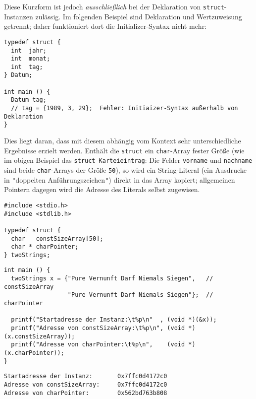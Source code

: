 Diese Kurzform ist jedoch \emph{ausschließlich} bei der Deklaration von \texttt{struct}-Instanzen zulässig. Im folgenden Beispiel sind Deklaration und Wertzuweisung getrennt; daher funktioniert dort die Initializer-Syntax nicht mehr:

\begin{codebox}
\begin{verbatim}
typedef struct {
  int  jahr;
  int  monat;
  int  tag;
} Datum;

int main () {
  Datum tag;
  // tag = {1989, 3, 29};  Fehler: Initiaizer-Syntax außerhalb von Deklaration
}
\end{verbatim}
\end{codebox}

Dies liegt daran, dass mit diesem abhängig vom Kontext sehr unterschiedliche Ergebnisse erzielt werden. Enthält die \texttt{struct} ein \texttt{char}-Array fester Größe (wie im obigen Beispiel das \texttt{struct Karteieintrag}: Die Felder \texttt{vorname} und \texttt{nachname} sind beide \texttt{char}-Arrays der Größe \texttt{50}), so wird ein String-Literal (ein Ausdrucke in \texttt{"}doppelten Anführungszeichen\texttt{"}) direkt in das Array kopiert; allgemeinen Pointern dagegen wird die Adresse des Literals selbst zugewisen.

\begin{codebox}
\begin{verbatim}
#include <stdio.h>
#include <stdlib.h>

typedef struct {
  char   constSizeArray[50];
  char * charPointer;
} twoStrings;
\end{verbatim}
\end{codebox}
%
\begin{codebox}[]
\begin{verbatim}
int main () {
  twoStrings x = {"Pure Vernunft Darf Niemals Siegen",   // constSizeArray
                  "Pure Vernunft Darf Niemals Siegen"};  // charPointer
  
  printf("Startadresse der Instanz:\t%p\n"  , (void *)(&x));
  printf("Adresse von constSizeArray:\t%p\n", (void *)(x.constSizeArray));
  printf("Adresse von charPointer:\t%p\n",    (void *)(x.charPointer));
}
\end{verbatim}
\end{codebox}

\begin{cmdbox}
\begin{verbatim}
Startadresse der Instanz:       0x7ffc0d4172c0
Adresse von constSizeArray:     0x7ffc0d4172c0
Adresse von charPointer:        0x562bd763b808
\end{verbatim}
\end{cmdbox}

